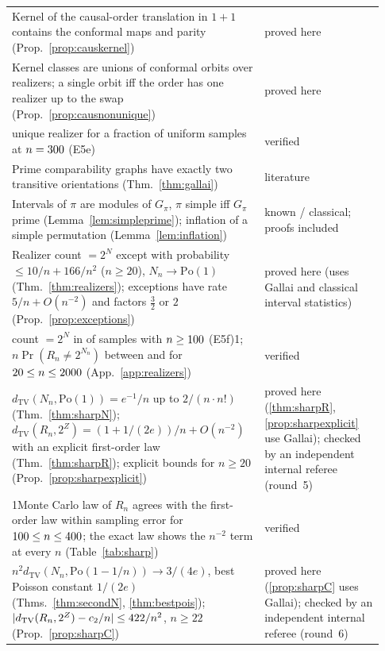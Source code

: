 \documentclass[11pt,a4paper]{article}
\providecommand{\HasRlawChk}{0}
\providecommand{\HasSharp}{0}
\theoremstyle{plain}
\theoremstyle{definition}
\theoremstyle{remark}
\begin{document}
\begin{table}[p]
\begin{tabular}{p{0.62\linewidth}>{\raggedright\arraybackslash}p{0.31\linewidth}}
Kernel of the causal-order translation in $1{+}1$ contains the conformal maps and parity (Prop.~\ref{prop:causkernel}) & proved here\\
Kernel classes are unions of conformal orbits over realizers; a single orbit iff the order has one realizer up to the swap (Prop.~\ref{prop:causnonunique}) & proved here\\
\quad unique realizer for a fraction \EfiveEuniqueNmax{} of uniform samples at $n=300$ (E5e) & verified\\
Prime comparability graphs have exactly two transitive orientations (Thm.~\ref{thm:gallai}) & literature\\
Intervals of $\pi$ are modules of $G_\pi$, $\pi$ simple iff $G_\pi$ prime (Lemma~\ref{lem:simpleprime}); inflation of a simple permutation (Lemma~\ref{lem:inflation}) & known / classical; proofs included\\
Realizer count $=2^N$ except with probability $\le10/n+166/n^2$ ($n\ge20$), $N_n\to\mathrm{Po}(1)$ (Thm.~\ref{thm:realizers}); exceptions have rate $5/n+O(n^{-2})$ and factors $\tfrac32$ or $2$ (Prop.~\ref{prop:exceptions}) & proved here (uses Gallai and classical interval statistics)\\
\quad count $=2^N$ in \RlawEqualBig{} of \RlawSamplesBig{} samples with $n\ge100$ (E5f)\if\HasRlawChk1; $n\Pr(R_n\ne2^{N_n})$ between \RlawChkNPlo{} and \RlawChkNPhi{} for $20\le n\le2000$ (App.~\ref{app:realizers})\fi & verified\\
$d_{\mathrm{TV}}(N_n,\mathrm{Po}(1))=e^{-1}/n$ up to $2/(n\cdot n!)$ (Thm.~\ref{thm:sharpN}); $d_{\mathrm{TV}}(R_n,2^Z)=(1+1/(2e))/n+O(n^{-2})$ with an explicit first-order law (Thm.~\ref{thm:sharpR}); explicit bounds for $n\ge20$ (Prop.~\ref{prop:sharpexplicit}) & proved here (\ref{thm:sharpR}, \ref{prop:sharpexplicit} use Gallai); checked by an independent internal referee (round~5)\\
\if\HasSharp1\quad Monte Carlo law of $R_n$ agrees with the first-order law within sampling error for $100\le n\le400$; the exact law shows the $n^{-2}$ term at every $n$ (Table~\ref{tab:sharp}) & verified\\
\fi $n^2d_{\mathrm{TV}}(N_n,\mathrm{Po}(1-1/n))\to3/(4e)$, best Poisson constant $1/(2e)$ (Thms.~\ref{thm:secondN}, \ref{thm:bestpois}); $|d_{\mathrm{TV}}(R_n,2^Z)-c_2/n|\le422/n^2$, $n\ge22$ (Prop.~\ref{prop:sharpC}) & proved here (\ref{prop:sharpC} uses Gallai); checked by an independent internal referee (round~6)\\

\end{tabular}
\end{table}
\end{document}
